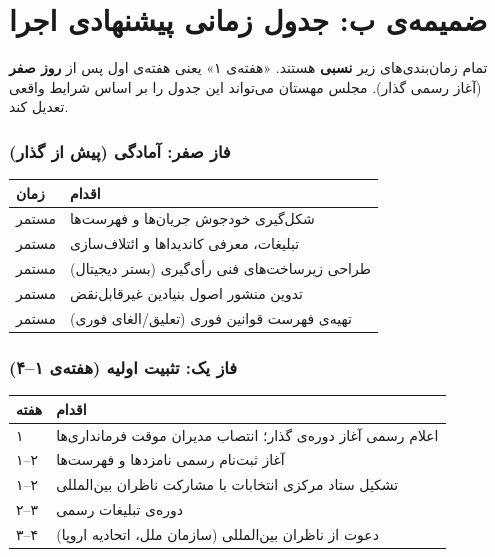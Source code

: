 \documentclass[12pt,a4paper,twoside,openany]{book}
\begin{document}
	\chapter{ضمیمه‌ی ب: جدول زمانی پیشنهادی اجرا}
	\label{app:timeline}
	
	\begin{notebox}
		تمام زمان‌بندی‌های زیر \textbf{نسبی} هستند. «هفته‌ی ۱» یعنی هفته‌ی اول پس از
		\textbf{روز صفر} (آغاز رسمی گذار). مجلس مهستان می‌تواند این جدول را بر اساس
		شرایط واقعی تعدیل کند.
	\end{notebox}
	
	\subsection*{فاز صفر: آمادگی (پیش از گذار)}
	\begin{adjustbox}{max width=\linewidth}
		\begin{tabular}{@{}lp{10cm}@{}}
			\toprule
			\textbf{زمان} & \textbf{اقدام} \\
			\midrule
			مستمر & شکل‌گیری خودجوش جریان‌ها و فهرست‌ها \\
			مستمر & تبلیغات، معرفی کاندیداها و ائتلاف‌سازی \\
			مستمر & طراحی زیرساخت‌های فنی رأی‌گیری (بستر دیجیتال) \\
			مستمر & تدوین منشور اصول بنیادین غیرقابل‌نقض \\
			مستمر & تهیه‌ی فهرست قوانین فوری (تعلیق/الغای فوری) \\
			\bottomrule
		\end{tabular}
	\end{adjustbox}
	
	\subsection*{فاز یک: تثبیت اولیه (هفته‌ی ۱--۴)}
	\begin{adjustbox}{max width=\linewidth}
		\begin{tabular}{@{}lp{10cm}@{}}
			\toprule
			\textbf{هفته} & \textbf{اقدام} \\
			\midrule
			\rowcolor{WarningBg}
			۱ & اعلام رسمی آغاز دوره‌ی گذار؛ انتصاب مدیران موقت فرمانداری‌ها \\
			۱--۲ & آغاز ثبت‌نام رسمی نامزدها و فهرست‌ها \\
			\rowcolor{WarningBg}
			۱--۲ & تشکیل ستاد مرکزی انتخابات با مشارکت ناظران بین‌المللی \\
			۲--۳ & دوره‌ی تبلیغات رسمی \\
			\rowcolor{WarningBg}
			۳--۴ & دعوت از ناظران بین‌المللی (سازمان ملل، اتحادیه اروپا) \\
			\bottomrule
		\end{tabular}
	\end{adjustbox}
	
\end{document}
